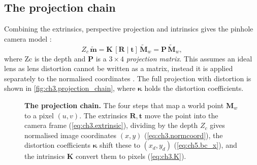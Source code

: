 \subsection{The projection chain}
\label{subsec:ch3.projection}
Combining the extrinsics, perspective projection and intrinsics gives the pinhole camera model \cite{zhangFlexibleNewTechnique2000}:
\begin{equation}
	Z_c\,\tilde{\mathbf{m}} = \mathbf{K}\,[\mathbf{R} \mid \mathbf{t}]\,\tilde{\mathbf{M}}_w = \mathbf{P}\,\tilde{\mathbf{M}}_w,
	\label{eq:ch3.P}
\end{equation}
where Zc is the depth and $\mathbf{P}$ is a $3 \times 4$ \textit{projection matrix}. 
This assumes an ideal lens as lens distortion cannot be written as a matrix, instead it is applied separately to
 the normalised coordinates \cite{heikkilaFourstepCameraCalibration1997,opencvCameraCalibration3DLink}.
  The full projection with distortion is shown in \autoref{fig:ch3.projection_chain},
where $\bm{\kappa}$ holds the distortion coefficients. 
\begin{figure}[H]
	\centering
	\caption[The projection chain]{\textbf{The projection chain.} The four steps that map a world point $\mathbf{M}_w$ to a pixel $(u, v)$.
	The extrinsics $\mathbf{R}, \mathbf{t}$ move the point into the camera frame (\autoref{eq:ch3.extrinsic}), dividing by the depth $Z_c$
	gives normalised image coordinates $(x, y)$ (\autoref{eq:ch3.normcoord}), the distortion coefficients $\bm{\kappa}$ shift these to
	$(x_d, y_d)$ (\autoref{eq:ch5.bc_x}), and the intrinsics $\mathbf{K}$ convert them to pixels (\autoref{eq:ch3.K}).}
	\label{fig:ch3.projection_chain}
\end{figure}
 
